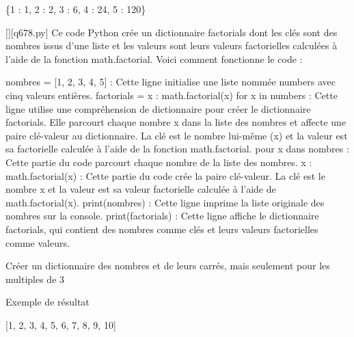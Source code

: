 \{1 : 1, 2 : 2, 3 : 6, 4 : 24, 5 : 120\}
        \par
        \begin{solution}
            \renewcommand{\nomfichier}{q678.py}
            \pythonfile{\chemincode \nomfichier}[][\nomfichier]
            Ce code Python crée un dictionnaire factorials dont les clés sont des nombres issus d'une liste et les valeurs sont leurs valeurs factorielles calculées à l'aide de la fonction math.factorial. Voici comment fonctionne le code :

    nombres = [1, 2, 3, 4, 5] : Cette ligne initialise une liste nommée numbers avec cinq valeurs entières.
    factorials = {x : math.factorial(x) for x in numbers} : Cette ligne utilise une compréhension de dictionnaire pour créer le dictionnaire factorials. Elle parcourt chaque nombre x dans la liste des nombres et affecte une paire clé-valeur au dictionnaire. La clé est le nombre lui-même (x) et la valeur est sa factorielle calculée à l'aide de la fonction math.factorial.
        pour x dans nombres : Cette partie du code parcourt chaque nombre de la liste des nombres.
        x : math.factorial(x) : Cette partie du code crée la paire clé-valeur. La clé est le nombre x et la valeur est sa valeur factorielle calculée à l'aide de math.factorial(x).
    print(nombres) : Cette ligne imprime la liste originale des nombres sur la console.
    print(factorials) : Cette ligne affiche le dictionnaire factorials, qui contient des nombres comme clés et leurs valeurs factorielles comme valeurs.
        \end{solution}
        

        \question
        Créer un dictionnaire des nombres et de leurs carrés, mais seulement pour les multiples de 3

Exemple de résultat

[1, 2, 3, 4, 5, 6, 7, 8, 9, 10]

